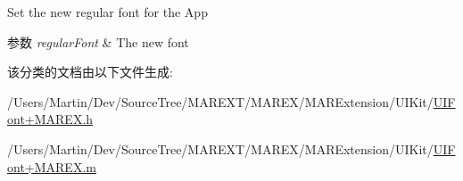 Set the new regular font for the App


\begin{DoxyParams}{参数}
{\em regular\+Font} & The new font \\
\hline
\end{DoxyParams}


该分类的文档由以下文件生成\+:\begin{DoxyCompactItemize}
\item 
/\+Users/\+Martin/\+Dev/\+Source\+Tree/\+M\+A\+R\+E\+X\+T/\+M\+A\+R\+E\+X/\+M\+A\+R\+Extension/\+U\+I\+Kit/\hyperlink{_u_i_font_09_m_a_r_e_x_8h}{U\+I\+Font+\+M\+A\+R\+E\+X.\+h}\item 
/\+Users/\+Martin/\+Dev/\+Source\+Tree/\+M\+A\+R\+E\+X\+T/\+M\+A\+R\+E\+X/\+M\+A\+R\+Extension/\+U\+I\+Kit/\hyperlink{_u_i_font_09_m_a_r_e_x_8m}{U\+I\+Font+\+M\+A\+R\+E\+X.\+m}\end{DoxyCompactItemize}
